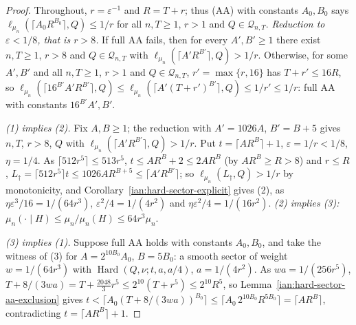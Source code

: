 \begin{proof}
Throughout, \(r=\varepsilon^{-1}\) and \(R=T+r\); thus (AA) with constants \(A_0,B_0\) says
\(\ell_{\mu_n}(\lceil A_0R^{B_0}\rceil,Q)\le1/r\) for all \(n,T\ge1\), \(r>1\) and \(Q\in\mathcal Q_{n,T}\).
\emph{Reduction to \(\varepsilon<1/8\), that is \(r>8\).} If
full AA fails, then for every \(A',B'\ge1\) there exist \(n,T\ge1\), \(r>8\) and \(Q\in\mathcal Q_{n,T}\) with
\(\ell_{\mu_n}(\lceil A'R^{B'}\rceil,Q)>1/r\). Otherwise, for some \(A',B'\) and all \(n,T\ge1\), \(r>1\) and
\(Q\in\mathcal Q_{n,T}\),
\(r'=\max\{r,16\}\) has \(T+r'\le16R\), so \(\ell_{\mu_n}(\lceil16^{B'}A'R^{B'}\rceil,Q)\le\ell_{\mu_n}(\lceil
A'(T+r')^{B'}\rceil,Q)\le1/r'\le1/r\): full AA with constants \(16^{B'}A',B'\).

\emph{(1) implies (2).} Fix \(A,B\ge1\); the reduction with \(A'=1026A\), \(B'=B+5\) gives \(n,T\), \(r>8\),
\(Q\) with \(\ell_{\mu_n}(\lceil A'R^{B'}\rceil,Q)>1/r\). Put \(t=\lceil AR^B\rceil+1\),
\(\varepsilon=1/r<1/8\), \(\eta=1/4\). As \(\lceil512r^5\rceil\le513r^5\), \(t\le AR^B+2\le2AR^B\) (by \(AR^B\ge
R>8\)) and \(r\le R\), \(L_\dagger=\lceil512r^5\rceil t\le1026AR^{B+5}\le\lceil A'R^{B'}\rceil\); so
\(\ell_{\mu_n}(L_\dagger,Q)>1/r\) by monotonicity, and Corollary~\ref{ian:hard-sector-explicit} gives (2), as
\(\eta\varepsilon^3/16=1/(64r^3)\), \(\varepsilon^2/4=1/(4r^2)\) and \(\eta\varepsilon^2/4=1/(16r^2)\).
\emph{(2) implies (3):} \(\mu_n(\cdot\mid H)\le\mu_n/\mu_n(H)\le64r^3\mu_n\).

\emph{(3) implies (1).} Suppose full AA holds with constants \(A_0,B_0\), and take the witness of (3) for
\(A=2^{10B_0}A_0\), \(B=5B_0\): a smooth sector of weight \(w=1/(64r^3)\) with
\(\operatorname{Hard}(Q,\nu;t,a,a/4)\), \(a=1/(4r^2)\). As \(wa=1/(256r^5)\),
\(T+8/(3wa)=T+\tfrac{2048}{3}r^5\le2^{10}(T+r^5)\le2^{10}R^5\), so Lemma~\ref{ian:hard-sector-aa-exclusion}
gives \(t<\lceil A_0(T+8/(3wa))^{B_0}\rceil\le\lceil A_0\,2^{10B_0}R^{5B_0}\rceil=\lceil AR^B\rceil\),
contradicting \(t=\lceil AR^B\rceil+1\).
\end{proof}
